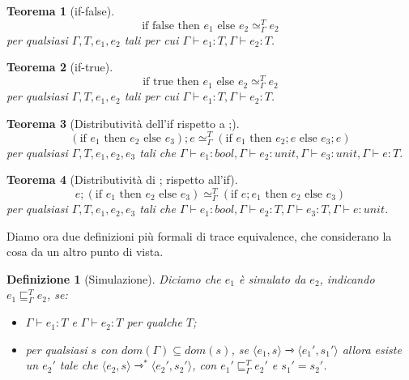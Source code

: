 \documentclass[a4paper, 11pt]{article}
\newtheorem{thm}{Teorema}[section]
\newtheorem{definit}{Definizione}[section]
\newcommand{\type}{\Gamma \vdash}
\newcommand{\goesto}{\rightarrowtriangle}
\newcommand{\treq}{\simeq_\Gamma^T}
\begin{document}
\begin{thm}[if-false]
	\[ \text{if false then }e_1 \text{ else } e_2 \treq e_2 \]
	per qualsiasi $\Gamma, T, e_1, e_2$ tali per cui $\type e_1:T, \type e_2:T$.
\end{thm}

\begin{thm}[if-true]
	\[ \text{if true then }e_1 \text{ else } e_2 \treq e_2 \]
	per qualsiasi $\Gamma, T, e_1, e_2$ tali per cui $\type e_1:T, \type e_2:T$.
\end{thm}

\begin{thm}[Distributività dell'if rispetto a ;]
	\[ (\text{if } e_1 \text{ then }e_2 \text{ else } e_3);e \treq (\text{if }e_1 \text{ then }e_2; e \text{ else }e_3; e) \]
	per qualsiasi $\Gamma, T, e_1, e_2, e_3$ tali che $\type e_1:bool, \type e_2:unit, \type e_3:unit, \type e:T$.
\end{thm}

\begin{thm}[Distributività di ; rispetto all'if]
	\[ e;(\text{if } e_1 \text{ then }e_2 \text{ else }e_3) \treq (\text{if } e;e_1 \text{ then }e_2 \text{ else }e_3) \]
	per qualsiasi $\Gamma, T, e_1, e_2, e_3$ tali che $\type e_1:bool, \type e_2:T, \type e_3:T, \type e:unit$.
\end{thm}

Diamo ora due definizioni più formali di trace equivalence, che considerano la cosa da un altro punto di vista.
\begin{definit}[Simulazione]
	Diciamo che $e_1$ è simulato da $e_2$, indicando $e_1 \sqsubseteq_\Gamma^T e_2$, se:\begin{itemize}
		\item $\type e_1:T$ e $\type e_2:T$ per qualche $T$;
		\item per qualsiasi $s$ con $dom(\Gamma) \subseteq dom(s)$, se $\langle e_1, s\rangle \goesto \langle e_1',s_1' \rangle$ allora esiste un $e_2'$ tale che $\langle e_2, s \rangle \goesto^\ast \langle e_2',s_2' \rangle$, con $e_1' \sqsubseteq_\Gamma^T e_2'$ e $s_1'=s_2'$.
	\end{itemize}
\end{definit}
\end{document}
